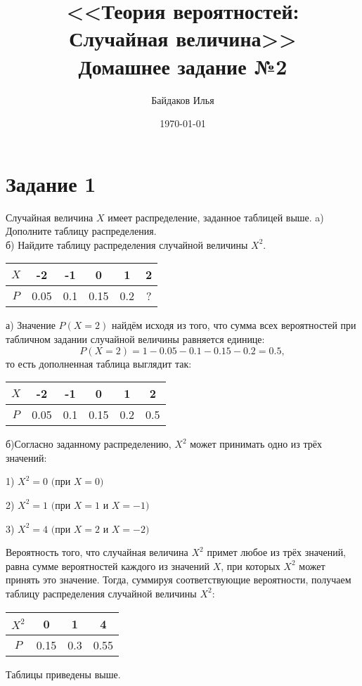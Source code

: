 \documentclass[a4paper,12pt]{article}
\newcommand{\ssolve}{\par\vspace{5pt}\noindent{\bf Решение. }\par}
\newcommand{\aanswer}{\par\vspace{5pt}\noindent{\bf Ответ. }}
\begin{document}
\title{<<Теория вероятностей:\\ Случайная величина>>\\ \vspace{12pt} Домашнее задание №2}
\author{Байдаков Илья}
\date{\today}
\maketitle

\section*{Задание 1}
Случайная величина $X$ имеет распределение, заданное таблицей выше.
a) Дополните таблицу распределения.\\
б) Найдите таблицу распределения случайной величины $X^2$. \par
\vspace{5pt}
\begin{tabular}{|c|c|c|c|c|c|}
\hline
$X$&-2&-1&0&1&2 \\
\hline
$P$&0.05&0.1&0.15&0.2&?\\
\hline
\end{tabular}
\vspace{5pt}
\ssolve
а) Значение $P(X=2)$ найдём исходя из того, что сумма всех вероятностей при табличном задании случайной величины равняется единице:
$$P(X=2)=1-0.05-0.1-0.15-0.2=0.5,$$
то есть дополненная таблица выглядит так: \par
\vspace{5pt}
\begin{tabular}{|c|c|c|c|c|c|}
\hline
$X$&-2&-1&0&1&2 \\
\hline
$P$&0.05&0.1&0.15&0.2&0.5\\
\hline
\end{tabular} \par
\vspace{10pt}
б)Согласно заданному распределению, $X^2$ может принимать одно из трёх значений: \par
1) $X^2=0 \text{ (при $X=0$)}$ \par
2) $X^2=1 \text{ (при $X=1$ и $X=-1$)}$ \par
3) $X^2=4 \text{ (при $X=2$ и $X=-2$)}$ \par

Вероятность того, что случайная величина $X^2$ примет любое из трёх значений, равна сумме вероятностей каждого из значений $X$, при которых $X^2$ может принять это значение. Тогда, суммируя соответствующие вероятности, получаем таблицу распределения случайной величины $X^2$:\par
\vspace{5pt}
\begin{tabular}{|c|c|c|c|}
\hline
$X^2$&0&1&4 \\
\hline
$P$&0.15&0.3&0.55\\
\hline
\end{tabular}
\aanswer Таблицы приведены выше.
\end{document}
